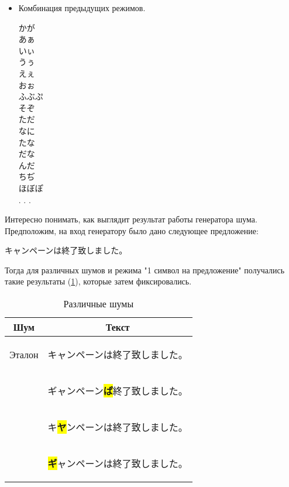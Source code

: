 \begin{itemize}
	\item[\MX] Комбинация предыдущих режимов.
		\begin{multicols}{3}
		\begin{CJK}{UTF8}{min}
			かが \\
			あぁ \\
			いぃ\\
			うぅ\\
			えぇ\\
			おぉ\\
			ふぶぷ   \\
			そぞ \\
			ただ \\
			なに \\
			たな \\
			だな \\
			んだ \\
			ちぢ \\
			ほぼぽ \\
		. . . \end{CJK}
	\end{multicols}
	
\end{itemize}

Интересно понимать, как выглядит результат работы генератора шума.
Предположим, на вход генератору было дано следующее предложение:

\begin{CJK}{UTF8}{min}キャンペーンは終了致しました。 \end{CJK} 

Тогда для различных шумов и режима "1 символ на предложение" получались такие результаты (\cref{table:noises}), которые затем фиксировались.

\begin{table}[H]
\begin{center}

\begin{tabular}{|c|c|} \hline
	Шум 	& Текст\\ \hline
	Эталон 	& \begin{CJK}{UTF8}{min}キャンペーンは終了致しました。 \end{CJK} \\
	\KG	&  \begin{CJK}{UTF8}{min}ギャンペーン\colorbox{yellow}{\textbf{ぱ}}終了致しました。 \end{CJK} \\
	\BS &  \begin{CJK}{UTF8}{min}キ\colorbox{yellow}{\textbf{ヤ}}ンペーンは終了致しました。 \end{CJK} \\
	\MX 	&  \begin{CJK}{UTF8}{min}\colorbox{yellow}{\textbf{ギ}}ャンペーンは終了致しました。 \end{CJK}  \\ \hline
\end{tabular}
\caption{Различные шумы}
\label{table:noises}
\end{center}
\end{table}

